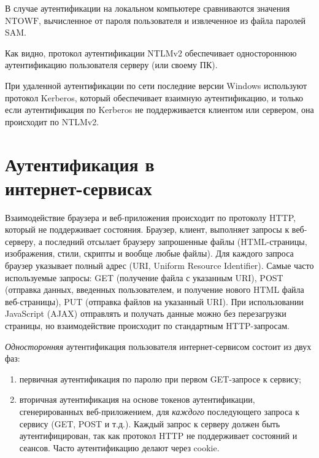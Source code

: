 \documentclass[10pt,a4paper]{book}
\begin{document}
В случае аутентификации на локальном компьютере сравниваются значения $\textrm{NTOWF}$, вычисленное от пароля пользователя и извлеченное из файла паролей SAM.

Как видно, протокол аутентификации NTLMv2 обеспечивает одностороннюю аутентификацию пользователя серверу (или своему ПК).

При удаленной аутентификации по сети последние версии Windows используют протокол Kerberos, который обеспечивает взаимную аутентификацию, и только если аутентификация по Kerberos не поддерживается клиентом или сервером, она происходит по NTLMv2.


\section[Аутентификация в интернет-сервисах]{Аутентификация в \protect\\ интернет-сервисах}

Взаимодействие браузера и веб-приложения происходит по протоколу HTTP, который не поддерживает состояния. Браузер, клиент, выполняет запросы к веб-серверу, а последний отсылает браузеру запрошенные файлы (HTML-страницы, изображения, стили, скрипты и вообще любые файлы). Для каждого запроса браузер указывает полный адрес (URI, Uniform Resource Identifier). Самые часто используемые запросы: GET (получение файла с указанным URI), POST (отправка данных, введенных пользователем, и получение нового HTML файла веб-страницы), PUT (отправка файлов на указанный URI). При использовании JavaScript (AJAX) отправлять и получать данные можно без перезагрузки страницы, но взаимодействие происходит по стандартным HTTP-запросам.

\emph{Односторонняя} аутентификация пользователя интернет-сервисом состоит из двух фаз:
\begin{enumerate}
    \item первичная аутентификация по паролю при первом GET-запросе к сервису;
    \item вторичная аутентификация на основе токенов аутентификации, сгенерированных веб-приложением, для \emph{каждого} последующего запроса к сервису (GET, POST и т.д.). Каждый запрос к серверу должен быть аутентифицирован, так как протокол HTTP не поддерживает состояний и сеансов. Часто аутентификацию делают через cookie.
\end{enumerate}
\end{document}
